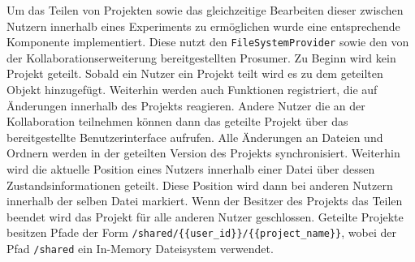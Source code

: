 Um das Teilen von Projekten sowie das gleichzeitige Bearbeiten dieser zwischen Nutzern innerhalb eines Experiments zu ermöglichen wurde eine entsprechende Komponente implementiert. Diese nutzt den \texttt{FileSystemProvider} sowie den von der Kollaborationserweiterung bereitgestellten Prosumer. Zu Beginn wird kein Projekt geteilt. Sobald ein Nutzer ein Projekt teilt wird es zu dem geteilten Objekt hinzugefügt. Weiterhin werden auch Funktionen registriert, die auf Änderungen innerhalb des Projekts reagieren. Andere Nutzer die an der Kollaboration teilnehmen können dann das geteilte Projekt über das bereitgestellte Benutzerinterface aufrufen. Alle Änderungen an Dateien und Ordnern werden in der geteilten Version des Projekts synchronisiert. Weiterhin wird die aktuelle Position eines Nutzers innerhalb einer Datei über dessen Zustandsinformationen geteilt. Diese Position wird dann bei anderen Nutzern innerhalb der selben Datei markiert. Wenn der Besitzer des Projekts das Teilen beendet wird das Projekt für alle anderen Nutzer geschlossen. Geteilte Projekte besitzen Pfade der Form \texttt{/shared/\{\{user\_id\}\}/\{\{project\_name\}\}}, wobei der Pfad \texttt{/shared} ein In-Memory Dateisystem verwendet.


